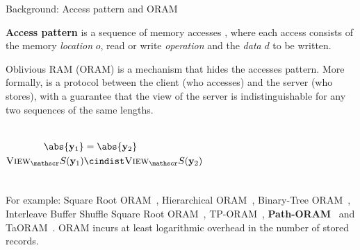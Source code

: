 	\begin{frame}{Background: Access pattern and ORAM}

		\justifying%

		\textbf{Access pattern} is a sequence of memory accesses \oramProgram{}, where each access consists of the memory \emph{location} $o$, read \oramRead{} or write \oramWrite{} \emph{operation} and the \emph{data} $d$ to be written.

		Oblivious RAM (ORAM) is a mechanism that hides the accesses pattern.
		More formally, \oram{} is a protocol between the client \client{} (who accesses) and the server \server{} (who stores), with a guarantee that the view of the server is indistinguishable for any two sequences of the same lengths.

		\begin{columns}[T]

				\[
					\begin{split}
						\abs{\oramProgram_1}					& = \abs{\oramProgram_2}							\\
						\textsc{View}_\server (\oramProgram_1)	& \cindist \textsc{View}_\server (\oramProgram_2)
					\end{split}
				\]



		\end{columns}

		\vspace*{1ex}

		For example: Square Root ORAM~\cite{oram-theory}, Hierarchical ORAM~\cite{oram-original}, Binary-Tree ORAM~\cite{binary-tree-oram}, Interleave Buffer Shuffle Square Root ORAM~\cite{shortest-path-oram}, TP-ORAM~\cite{tp-oram}, \textbf{Path-ORAM}~\cite{path-oram} and TaORAM~\cite{taostore}.
		\alert{ORAM incurs at least logarithmic overhead in the number of stored records.~\cite{oram-original}}

	\end{frame}

